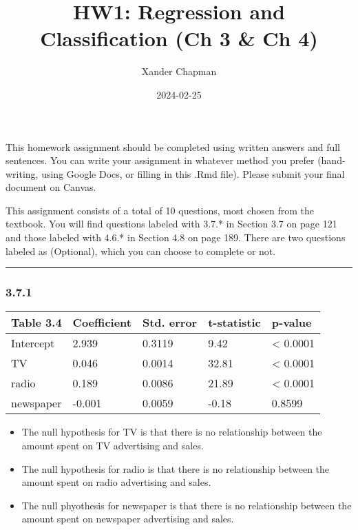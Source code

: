\documentclass[
]{article}
\title{HW1: Regression and Classification (Ch 3 \& Ch 4)}
\author{Xander Chapman}
\date{2024-02-25}
\providecommand{\tightlist}{%
  \setlength{\itemsep}{0pt}\setlength{\parskip}{0pt}}
\begin{document}
\maketitle

This homework assignment should be completed using written answers and
full sentences. You can write your assignment in whatever method you
prefer (hand-writing, using Google Docs, or filling in this .Rmd file).
Please submit your final document on Canvas.

This assignment consists of a total of 10 questions, most chosen from
the textbook. You will find questions labeled with 3.7.* in Section 3.7
on page 121 and those labeled with 4.6.* in Section 4.8 on page 189.
There are two questions labeled as (Optional), which you can choose to
complete or not.

\begin{center}\rule{0.5\linewidth}{0.5pt}\end{center}

\subsubsection{3.7.1}\label{section}

\begin{longtable}[]{@{}lllll@{}}
\toprule\noalign{}
Table 3.4 & Coefficient & Std. error & t-statistic & p-value \\
\midrule\noalign{}
\endhead
\bottomrule\noalign{}
\endlastfoot
Intercept & 2.939 & 0.3119 & 9.42 & \textless{} 0.0001 \\
TV & 0.046 & 0.0014 & 32.81 & \textless{} 0.0001 \\
radio & 0.189 & 0.0086 & 21.89 & \textless{} 0.0001 \\
newspaper & -0.001 & 0.0059 & -0.18 & 0.8599 \\
\end{longtable}

\begin{itemize}
\tightlist
\item
  The null hypothesis for TV is that there is no relationship between
  the amount spent on TV advertising and sales.
\item
  The null hypothesis for radio is that there is no relationship between
  the amount spent on radio advertising and sales.
\item
  The null phyothesis for newspaper is that there is no relationship
  between the amount spent on newspaper advertising and sales.
\end{itemize}
\end{document}

